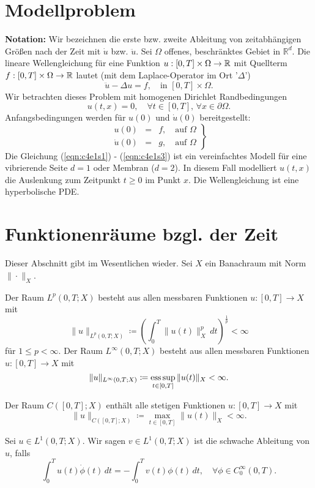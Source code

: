 \documentclass[../skript.tex]{subfiles}
\begin{document}
\section{Modellproblem}\label{sec:c4e1}
\textbf{Notation:} Wir bezeichnen die erste bzw. zweite Ableitung von zeitabhängigen Größen nach der Zeit mit $\dot{u}$ bzw. $\ddot{u}$. Sei $\Omega$ offenes, beschränktes Gebiet in $\mathbb{R}^d$. Die lineare Wellengleichung für eine Funktion $u:[0,T]\times\Omega\to\mathbb{R}$ mit Quellterm $f:[0,T]\times\Omega\to\mathbb{R}$ lautet (mit dem Laplace-Operator im Ort '$\Delta$')
\begin{equation}\label{eqn:c4e1s1}
	\ddot{u}-\Delta u = f,\quad\text{in }[0,T]\times\Omega.
\end{equation}
Wir betrachten dieses Problem mit homogenen Dirichlet Randbedingungen
\begin{equation}\label{eqn:c4e1s2}
	u(t,x) = 0,\quad\forall t\in[0,T],\,\forall x\in\partial\Omega.
\end{equation}
Anfangsbedingungen werden für $u(0)$ und $\dot{u}(0)$ bereitgestellt:
\begin{equation}\label{eqn:c4e1s3}
	\left.
	\begin{aligned}
		u(0) &=& f,\quad\text{auf }\Omega\\
		\dot{u}(0) &=& g,\quad\text{auf }\Omega
	\end{aligned}
	\right\}
\end{equation}
Die Gleichung (\ref {eqn:c4e1s1}) - (\ref {eqn:c4e1s3}) ist ein vereinfachtes Modell für eine vibrierende Seite $d=1$ oder Membran ($d=2$). In diesem Fall modelliert $u(t,x)$ die Auslenkung zum Zeitpunkt $t\geq 0$ im Punkt $x$. Die Wellengleichung ist eine hyperbolische PDE.

\section{Funktionenräume bzgl. der Zeit} 
Dieser Abschnitt gibt im Wesentlichen \cite[Sec. 5.9.2]{Evans} wieder. Sei $X$ ein Banachraum mit Norm $\|\cdot\|_X$.
\begin{definition}\label{def:c4e2s1}
	Der Raum $L^p(0,T;X)$ besteht aus allen messbaren Funktionen $u:[0,T]\to X$ mit
	\[
		\|u\|_{L^p(0,T;X)} \coloneqq \left( \int_0^T \|u(t)\|_X^p\,dt \right)^{\frac{1}{p}} < \infty
	\]
	für $1\leq p < \infty$.\newline\noindent
	Der Raum $L^\infty(0,T;X)$ besteht aus allen messbaren Funktionen $u:[0,T]\to X$ mit 
	\[
		\|u\|_{L^\infty(0,T;X)} \coloneqq \operatorname*{ess\,sup}_{t\in[0,T]} \|u(t)\|_X < \infty.
	\]
\end{definition}

\begin{definition}\label{def:c4e2s2}
	Der Raum $C([0,T];X)$ enthält alle stetigen Funktionen $u:[0,T]\to X$ mit 
	\[
		\|u\|_{C([0,T];X)} \coloneqq \max_{t\in[0,T]} \|u(t)\|_X < \infty.
	\]
\end{definition}

\begin{definition}\label{def:c4e2s3}
	Sei $u\in L^1(0,T;X)$. Wir sagen $v\in L^1(0,T;X)$ ist die schwache Ableitung von $u$, falls
	\[
		\int_0^T u(t)\dot{\phi}(t)\,dt = - \int_0^T v(t)\phi(t)\,dt,\quad\forall\phi\in C^\infty_0(0,T).
	\]
\end{definition}
\end{document}
